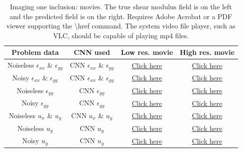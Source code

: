 \documentclass[12pt]{article}
\begin{document}
\begin{table}
  \centering
  \begin{tabular}{|c|c|c|c|}
    \hline
    Problem data & CNN used & Low res. movie  & High res. movie\\
    \hline
    Noiseless $\epsilon_{xx}$ \& $\epsilon_{yy}$ & CNN $\epsilon_{xx}$ \& $\epsilon_{yy}$ &
    \href{run:movies/one/field\_strainxxyy\_noise\_0.0\_movie.mp4}{Click here} & 
    \href{run:movies\_hi\_res/one/field\_strainxxyy\_noise\_0.0\_movie\_hires.mp4}{Click here}\\
    \hline
    Noisy $\epsilon_{xx}$ \& $\epsilon_{yy}$ & CNN $\epsilon_{xx}$ \& $\epsilon_{yy}$ &
    \href{run:movies/one/field\_strainxxyy\_noise\_0.02\_movie.mp4}{Click here} &
    \href{run:movies\_hi\_res/one/field\_strainxxyy\_noise\_0.02\_movie\_hires.mp4}{Click here}\\ 
    \hline
    Noiseless $\epsilon_{yy}$ & CNN $\epsilon_{yy}$ &
    \href{run:movies/one/field\_strainyy\_noise\_0.0\_movie.mp4}{Click here} &
    \href{run:movies\_hi\_res/one/field\_strainyy\_noise\_0.0\_movie\_hires.mp4}{Click here}\\
    \hline
    Noisy $\epsilon_{yy}$ & CNN $\epsilon_{yy}$ &
    \href{run:movies/one/field\_strainyy\_noise\_0.02\_movie.mp4}{Click here} &
    \href{run:movies\_hi\_res/one/field\_strainyy\_noise\_0.02\_movie\_hires.mp4}{Click here}\\
    \hline
    Noiseless $u_x$ \& $u_y$ & CNN $u_x$ \& $u_y$ &
    \href{run:movies/one/field\_images\_noise\_0.0\_movie.mp4}{Click here} &
    \href{run:movies\_hi\_res/one/field\_images\_noise\_0.0\_movie\_hires.mp4}{Click here}\\
    \hline
    Noiseless $u_y$ & CNN $u_y$ &
    \href{run:movies/one/field\_imagesy\_noise\_0.0\_movie.mp4}{Click here} &
    \href{run:movies\_hi\_res/one/field\_imagesy\_noise\_0.0\_movie\_hires.mp4}{Click here}\\
    \hline
    Noisy $u_y$ & CNN $u_y$ &
    \href{run:movies/one/field\_imagesy\_noise\_0.02\_movie.mp4}{Click here} &
    \href{run:movies\_hi\_res/one/field\_imagesy\_noise\_0.02\_movie\_hires.mp4}{Click here}\\
    \hline
  \end{tabular}
  \caption{\label{fig:oneinc:movie} Imaging one inclusion: movies. The true shear modulus field is on the left and the predicted field is on the right. Requires Adobe Acrobat or a PDF viewer supporting the \textbackslash{href} command. The system video file player, such as VLC, should be capable of playing mp4 files.}
\end{table}
\end{document}
